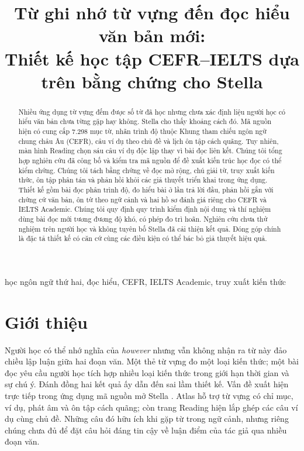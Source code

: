 \documentclass[conference,10pt]{IEEEtran}
\begin{document}
\title{Từ ghi nhớ từ vựng đến đọc hiểu văn bản mới:\\Thiết kế học tập CEFR--IELTS dựa trên bằng chứng cho Stella}
\author{}
\maketitle
\begin{abstract}
Nhiều ứng dụng từ vựng đếm được số từ đã học nhưng chưa xác định liệu người học có hiểu văn bản chưa từng gặp hay không. Stella cho thấy khoảng cách đó. Mã nguồn hiện có cung cấp 7.298 mục từ, nhãn trình độ thuộc Khung tham chiếu ngôn ngữ chung châu Âu (CEFR), câu ví dụ theo chủ đề và lịch ôn tập cách quãng. Tuy nhiên, màn hình Reading chọn sáu câu ví dụ độc lập thay vì bài đọc liên kết. Chúng tôi tổng hợp nghiên cứu đã công bố và kiểm tra mã nguồn để đề xuất kiến trúc học đọc có thể kiểm chứng. Chúng tôi tách bằng chứng về đọc mở rộng, chú giải từ, truy xuất kiến thức, ôn tập phân tán và phản hồi khỏi các giả thuyết triển khai trong ứng dụng. Thiết kế gồm bài đọc phân trình độ, đo hiểu bài ở lần trả lời đầu, phản hồi gắn với chứng cứ văn bản, ôn từ theo ngữ cảnh và hai hồ sơ đánh giá riêng cho CEFR và IELTS Academic. Chúng tôi quy định quy trình kiểm định nội dung và thí nghiệm dùng bài đọc mới tương đương độ khó, có phép đo trì hoãn. Nghiên cứu chưa thử nghiệm trên người học và không tuyên bố Stella đã cải thiện kết quả. Đóng góp chính là đặc tả thiết kế có căn cứ cùng các điều kiện có thể bác bỏ giả thuyết hiệu quả.
\end{abstract}
\begin{IEEEkeywords}
học ngôn ngữ thứ hai, đọc hiểu, CEFR, IELTS Academic, truy xuất kiến thức
\end{IEEEkeywords}

\section{Giới thiệu}
Người học có thể nhớ nghĩa của \emph{however} nhưng vẫn không nhận ra từ này đảo chiều lập luận giữa hai đoạn văn. Một thẻ từ vựng đo một loại kiến thức; một bài đọc yêu cầu người học tích hợp nhiều loại kiến thức trong giới hạn thời gian và sự chú ý. Đánh đồng hai kết quả ấy dẫn đến sai lầm thiết kế. Vấn đề xuất hiện trực tiếp trong ứng dụng mã nguồn mở Stella \cite{stellarepo}. Atlas hỗ trợ từ vựng có chỉ mục, ví dụ, phát âm và ôn tập cách quãng; còn trang Reading hiện lắp ghép các câu ví dụ cùng chủ đề. Những câu đó hữu ích khi gặp từ trong ngữ cảnh, nhưng riêng chúng chưa đủ để đặt câu hỏi đáng tin cậy về luận điểm của tác giả qua nhiều đoạn văn.
\end{document}
